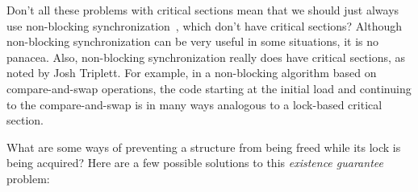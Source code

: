 \QuickQ{}
	Don't all these problems with critical sections mean that
	we should just always use
	non-blocking synchronization~\cite{MauriceHerlihy90a},
	which don't have critical sections?
\QuickA{}
	Although non-blocking synchronization can be very useful
	in some situations, it is no panacea.
	Also, non-blocking synchronization really does have
	critical sections, as noted by Josh Triplett.
	For example, in a non-blocking algorithm based on
	compare-and-swap operations, the code starting at the
	initial load and continuing to the compare-and-swap
	is in many ways analogous to a lock-based critical section.

\QuickQ{}
	What are some ways of preventing a structure from being freed while
	its lock is being acquired?
\QuickA{}
	Here are a few possible solutions to this \emph{existence guarantee}
	problem:

